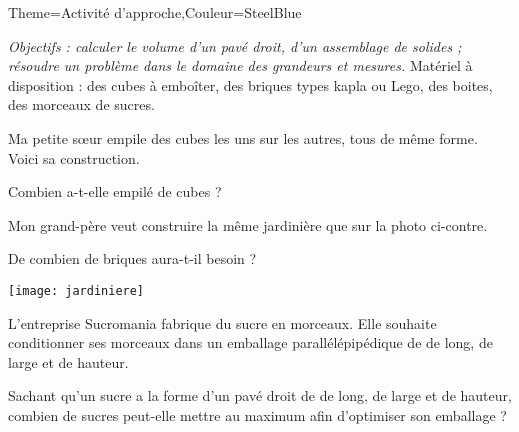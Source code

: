 \begin{Maquette}[Cours]{Theme={Activité d'approche},Couleur={SteelBlue}}

   
      {\it Objectifs : calculer le volume d'un pavé droit, d'un assemblage de solides ; résoudre un problème dans le domaine des grandeurs et mesures.} Matériel à disposition : des cubes à emboîter, des briques types kapla ou Lego, des boites, des morceaux de sucres.
      
      \begin{AActivite}

         \begin{minipage}{11.5cm}
             \par
            Ma petite s\oe ur empile des cubes les uns sur les autres, tous de même forme. Voici sa construction. \par
            Combien a-t-elle empilé de cubes ?
            \vspace*{1.7cm}
         \end{minipage}
         \qquad
         \begin{minipage}{4.5cm}
         \end{minipage}
         
         \bigskip

         \begin{minipage}{9cm}
            Mon grand-père veut construire la même jardinière que sur la photo ci-contre. \par
            De combien de briques aura-t-il besoin ?
            \vspace*{2.2cm}
         \end{minipage}
         \qquad
         \begin{minipage}{7cm}
            \texttt{[image: jardiniere]}
         \end{minipage}
         
         \bigskip

            L’entreprise Sucromania fabrique du sucre en morceaux. Elle souhaite conditionner ses morceaux dans un emballage parallélépipédique de  de long,  de large et  de hauteur. \par
            Sachant qu’un sucre a la forme d’un pavé droit de  de long,  de large et  de hauteur, combien de sucres peut-elle mettre au maximum afin d’optimiser son emballage ?
            \vspace*{7cm}


\end{AActivite}
\end{Maquette}
